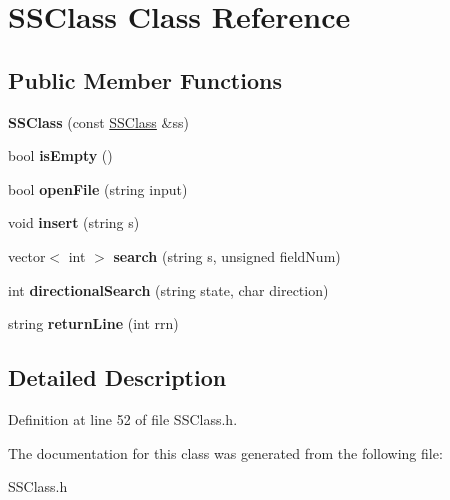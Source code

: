 \hypertarget{classSSClass}{}\section{S\+S\+Class Class Reference}
\label{classSSClass}
\subsection*{Public Member Functions}
\begin{DoxyCompactItemize}
\item 
\mbox{\label{classSSClass_a5801614847b5403b1a5899150acd3b5c}} 
{\bfseries S\+S\+Class} (const \hyperlink{classSSClass}{S\+S\+Class} \&ss)
\item 
\mbox{\label{classSSClass_afc95611385e4d389818332414d5c491c}} 
bool {\bfseries is\+Empty} ()
\item 
\mbox{\label{classSSClass_a92e012441608ea36f3013fb3cbea9da8}} 
bool {\bfseries open\+File} (string input)
\item 
\mbox{\label{classSSClass_a45c5585c784bf7c4f823f66426664aea}} 
void {\bfseries insert} (string s)
\item 
\mbox{\label{classSSClass_a9df3598c000a6a5e9ef994d19196e69f}} 
vector$<$ int $>$ {\bfseries search} (string s, unsigned field\+Num)
\item 
\mbox{\label{classSSClass_ad03c99840c2946a2112f5f1942c287f2}} 
int {\bfseries directional\+Search} (string state, char direction)
\item 
\mbox{\label{classSSClass_ab0a8ea1af895df28359b5733bd920ef3}} 
string {\bfseries return\+Line} (int rrn)
\end{DoxyCompactItemize}


\subsection{Detailed Description}


Definition at line 52 of file S\+S\+Class.\+h.



The documentation for this class was generated from the following file\+:\begin{DoxyCompactItemize}
\item 
S\+S\+Class.\+h\end{DoxyCompactItemize}
